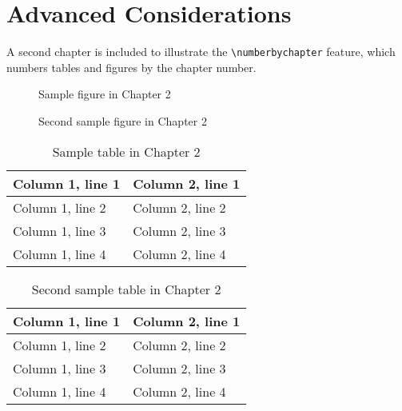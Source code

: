 \documentclass[dvips,11pt,oneside]{report}
\begin{document}
\chapter{Advanced Considerations}

A second chapter is included to illustrate the \verb+\numberbychapter+ feature,
which numbers tables and figures by the chapter number.

\begin{figure} \caption{Sample figure in Chapter 2} \begin{center}
\end{center} \end{figure}

\begin{figure} \caption{Second sample figure in Chapter 2} \begin{center}
\end{center} \end{figure}

\begin{table} \caption{Sample table in Chapter 2} \begin{center}
\begin{tabular}{|l|l|} \hline
Column 1, line 1 & Column 2, line 1 \\ \hline
Column 1, line 2 & Column 2, line 2 \\ \hline
Column 1, line 3 & Column 2, line 3 \\ \hline
Column 1, line 4 & Column 2, line 4 \\ \hline
\end{tabular} \end{center} \end{table}

\begin{table} \caption{Second sample table in Chapter 2} \begin{center}
\begin{tabular}{|l|l|} \hline
Column 1, line 1 & Column 2, line 1 \\ \hline
Column 1, line 2 & Column 2, line 2 \\ \hline
Column 1, line 3 & Column 2, line 3 \\ \hline
Column 1, line 4 & Column 2, line 4 \\ \hline
\end{tabular} \end{center} \end{table}
\end{document}
